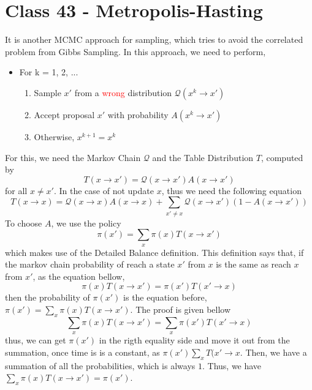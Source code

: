 \documentclass{article}
\begin{document}
\section{Class 43 - Metropolis-Hasting}
It is another MCMC approach for sampling, which tries to avoid the correlated problem from Gibbs Sampling. In this approach, we need to perform,
\begin{itemize}
    \item For k = 1, 2, ... \begin{enumerate}
        \item Sample $x'$ from a \textcolor{red}{wrong} distribution $\mathcal{Q}(x^k \rightarrow x')$
        \item Accept proposal $x'$ with probability $A(x^k \rightarrow x')$
        \item Otherwise, $x^{k+1} = x^k$
    \end{enumerate}
\end{itemize}
For this, we need the Markov Chain $\mathcal{Q}$ and the Table Distribution $T$, computed by
\begin{equation}
    T(x \rightarrow x') = \mathcal{Q}(x \rightarrow x')A(x \rightarrow x')
\end{equation}
for all $x \neq x'$. In the case of not update $x$, thus we need the following equation
\begin{equation}
    T(x \rightarrow x) = \mathcal{Q}(x \rightarrow x)A(x \rightarrow x) + \sum_{x'\neq x} \mathcal{Q}(x \rightarrow x')(1 - A(x \rightarrow x'))
\end{equation}
To choose $A$, we use the policy
\begin{equation}
    \pi(x') = \sum_x \pi(x)T(x\rightarrow x')
\end{equation}
which makes use of the Detailed Balance definition. This definition says that, if the markov chain probability of reach a state $x'$ from $x$ is the same as reach $x$ from $x'$, as the equation bellow,
\begin{equation}
    \pi(x)T(x \rightarrow x') = \pi(x')T(x' \rightarrow x)
\end{equation}
then the probability of $\pi(x')$ is the equation before, $\pi(x') = \sum_x \pi(x)T(x\rightarrow x')$. The proof is given bellow
\begin{equation}
    \sum_x \pi(x)T(x\rightarrow x') = \sum_x \pi(x')T(x'\rightarrow x)
\end{equation}
thus, we can get $\pi(x')$ in the rigth equality side and move it out from the summation, once time is is a constant, as $\pi(x') \sum_x T(x'\rightarrow x$. Then, we have a summation of all the probabilities, which is always $1$. Thus, we have $\sum_x \pi(x)T(x\rightarrow x') =  \pi(x')$.
\end{document}
